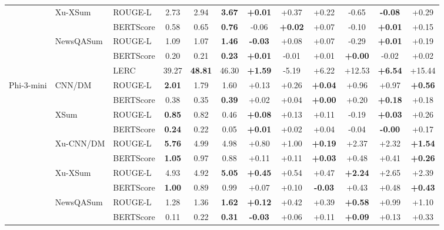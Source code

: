 \begin{table}[b]
{\begin{tabular}{lll|ccc|cccccc}
\cmidrule(lr){2-12}
 & \multirow{2}{*}{Xu-XSum} & ROUGE-L & 2.73 & 2.94 & \textbf{3.67} & \textbf{+0.01} & +0.37 & +0.22 & -0.65 & \textbf{-0.08} & +0.29 \\
 &  & BERTScore & 0.58 & 0.65 & \textbf{0.76} & -0.06 & \textbf{+0.02} & +0.07 & -0.10 & \textbf{+0.01} & +0.15 \\
\cmidrule(lr){2-12}
 & \multirow{3}{*}{NewsQASum} & ROUGE-L & 1.09 & 1.07 & \textbf{1.46} & \textbf{-0.03} & +0.08 & +0.07 & -0.29 & \textbf{+0.01} & +0.19 \\
 &  & BERTScore & 0.20 & 0.21 & \textbf{0.23} & \textbf{+0.01} & -0.01 & +0.01 & \textbf{+0.00} & -0.02 & +0.02 \\
 &  & LERC & 39.27 & \textbf{48.81} & 46.30 & \textbf{+1.59} & -5.19 & +6.22 & +12.53 & \textbf{+6.54} & +15.44 \\
\midrule
\multirow{11}{*}{Phi-3-mini} & \multirow{2}{*}{CNN/DM} & ROUGE-L & \textbf{2.01} & 1.79 & 1.60 & +0.13 & +0.26 & \textbf{+0.04} & +0.96 & +0.97 & \textbf{+0.56} \\
 &  & BERTScore & 0.38 & 0.35 & \textbf{0.39} & +0.02 & +0.04 & \textbf{+0.00} & +0.20 & \textbf{+0.18} & +0.18 \\
\cmidrule(lr){2-12}
 & \multirow{2}{*}{XSum} & ROUGE-L & \textbf{0.85} & 0.82 & 0.46 & \textbf{+0.08} & +0.13 & +0.11 & -0.19 & \textbf{+0.03} & +0.26 \\
 &  & BERTScore & \textbf{0.24} & 0.22 & 0.05 & \textbf{+0.01} & +0.02 & +0.04 & -0.04 & \textbf{-0.00} & +0.17 \\
\cmidrule(lr){2-12}
 & \multirow{2}{*}{Xu-CNN/DM} & ROUGE-L & \textbf{5.76} & 4.99 & 4.98 & +0.80 & +1.00 & \textbf{+0.19} & +2.37 & +2.32 & \textbf{+1.54} \\
 &  & BERTScore & \textbf{1.05} & 0.97 & 0.88 & +0.11 & +0.11 & \textbf{+0.03} & +0.48 & +0.41 & \textbf{+0.26} \\
\cmidrule(lr){2-12}
 & \multirow{2}{*}{Xu-XSum} & ROUGE-L & 4.93 & 4.92 & \textbf{5.05} & \textbf{+0.45} & +0.54 & +0.47 & \textbf{+2.24} & +2.65 & +2.39 \\
 &  & BERTScore & \textbf{1.00} & 0.89 & 0.99 & +0.07 & +0.10 & \textbf{-0.03} & +0.43 & +0.48 & \textbf{+0.43} \\
\cmidrule(lr){2-12}
 & \multirow{3}{*}{NewsQASum} & ROUGE-L & 1.28 & 1.36 & \textbf{1.62} & \textbf{+0.12} & +0.42 & +0.39 & \textbf{+0.58} & +0.99 & +1.10 \\
 &  & BERTScore & 0.11 & 0.22 & \textbf{0.31} & \textbf{-0.03} & +0.06 & +0.11 & \textbf{+0.09} & +0.13 & +0.33 \\

\end{tabular}}
\end{table}
